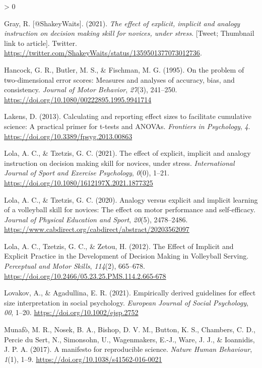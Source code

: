 \documentclass[
  english,
  man,floatsintext]{apa7}
\newlength{\cslhangindent}
\newenvironment{CSLReferences}[2] %
 {%
  \setlength{\parindent}{0pt}
  \ifodd #1 \everypar{\setlength{\hangindent}{\cslhangindent}}\ignorespaces\fi
  \ifnum #2 > 0
  \setlength{\parskip}{#2\baselineskip}
  \fi
 }%
 {}
\begin{document}
\begin{CSLReferences}{1}{0}
\leavevmode\hypertarget{ref-gray2021}{}%
Gray, R. {[}@ShakeyWaits{]}. (2021). \emph{The effect of explicit, implicit and analogy instruction on decision making skill for novices, under stress}. {[}Tweet; Thumbnail link to article{]}. Twitter. \url{https://twitter.com/ShakeyWaits/status/1359501377073012736}.

\leavevmode\hypertarget{ref-hancock1995}{}%
Hancock, G. R., Butler, M. S., \& Fischman, M. G. (1995). On the problem of two-dimensional error scores: Measures and analyses of accuracy, bias, and consistency. \emph{Journal of Motor Behavior}, \emph{27}(3), 241--250. \url{https://doi.org/10.1080/00222895.1995.9941714}

\leavevmode\hypertarget{ref-lakens2013}{}%
Lakens, D. (2013). Calculating and reporting effect sizes to facilitate cumulative science: A practical primer for t-tests and ANOVAs. \emph{Frontiers in Psychology}, \emph{4}. \url{https://doi.org/10.3389/fpsyg.2013.00863}

\leavevmode\hypertarget{ref-lola2021}{}%
Lola, A. C., \& Tzetzis, G. C. (2021). The effect of explicit, implicit and analogy instruction on decision making skill for novices, under stress. \emph{International Journal of Sport and Exercise Psychology}, \emph{0}(0), 1--21. \url{https://doi.org/10.1080/1612197X.2021.1877325}

\leavevmode\hypertarget{ref-lola2020}{}%
Lola, A. C., \& Tzetzis, G. C. (2020). Analogy versus explicit and implicit learning of a volleyball skill for novices: The effect on motor performance and self-efficacy. \emph{Journal of Physical Education and Sport}, \emph{20}(5), 2478--2486. \url{https://www.cabdirect.org/cabdirect/abstract/20203562097}

\leavevmode\hypertarget{ref-lola2012}{}%
Lola, A. C., Tzetzis, G. C., \& Zetou, H. (2012). The Effect of Implicit and Explicit Practice in the Development of Decision Making in Volleyball Serving. \emph{Perceptual and Motor Skills}, \emph{114}(2), 665--678. \url{https://doi.org/10.2466/05.23.25.PMS.114.2.665-678}

\leavevmode\hypertarget{ref-lovakov2021}{}%
Lovakov, A., \& Agadullina, E. R. (2021). Empirically derived guidelines for effect size interpretation in social psychology. \emph{European Journal of Social Psychology}, \emph{00}, 1--20. \url{https://doi.org/10.1002/ejsp.2752}

\leavevmode\hypertarget{ref-munafo2017}{}%
Munafò, M. R., Nosek, B. A., Bishop, D. V. M., Button, K. S., Chambers, C. D., Percie du Sert, N., Simonsohn, U., Wagenmakers, E.-J., Ware, J. J., \& Ioannidis, J. P. A. (2017). A manifesto for reproducible science. \emph{Nature Human Behaviour}, \emph{1}(1), 1--9. \url{https://doi.org/10.1038/s41562-016-0021}


\end{CSLReferences}
\end{document}

